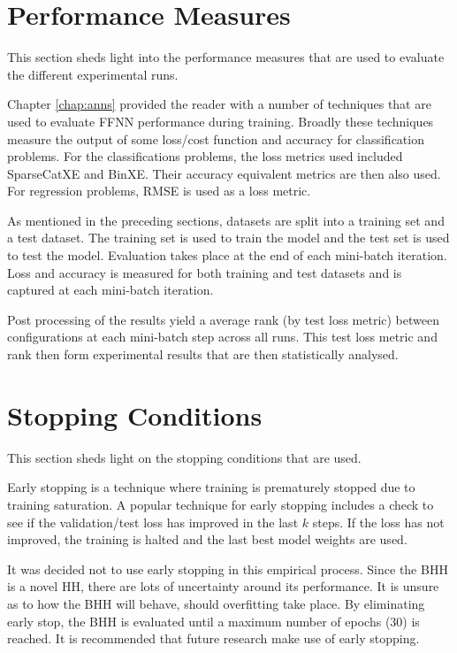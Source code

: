 \section{Performance Measures}
\label{sec:methodology:performance_measures}

This section sheds light into the performance measures that are used to evaluate the different experimental runs. 

Chapter \ref{chap:anns} provided the reader with a number of techniques that are used to evaluate \ac{FFNN} performance during training. Broadly these techniques measure the output of some loss/cost function and accuracy for classification problems. For the classifications problems, the loss metrics used included \ac{SparseCatXE} and \ac{BinXE}. Their accuracy equivalent metrics are then also used. For regression problems, \ac{RMSE} is used as a loss metric.

As mentioned in the preceding sections, datasets are split into a training set and a test dataset. The training set is used to train the model and the test set is used to test the model. Evaluation takes place at the end of each mini-batch iteration. Loss and accuracy is measured for both training and test datasets and is captured at each mini-batch iteration.

Post processing of the results yield a average rank (by test loss metric) between configurations at each mini-batch step across all runs. This test loss metric and rank then form experimental results that are then statistically analysed. 

\section{Stopping Conditions}
\label{sec:methodology:stopping_conditions}

This section sheds light on the stopping conditions that are used.

Early stopping is a technique where training is prematurely stopped due to training saturation. A popular technique for early stopping includes a check to see if the validation/test loss has improved in the last $k$ steps. If the loss has not improved, the training is halted and the last best model weights are used.

It was decided not to use early stopping in this empirical process. Since the \ac{BHH} is a novel \ac{HH}, there are lots of uncertainty around its performance. It is unsure as to how the \ac{BHH} will behave, should overfitting take place. By eliminating early stop, the \ac{BHH} is evaluated until a maximum number of epochs (30) is reached. It is recommended that future research make use of early stopping.

